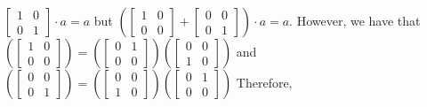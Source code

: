 \documentclass[]{article}
\begin{document}
$
\begin{bmatrix}
	1 & 0 \\
	0 & 1 
\end{bmatrix}
\cdot a = a$
but 
$
\left(\begin{bmatrix}
	1 & 0 \\
	0 & 0 
\end{bmatrix} + \begin{bmatrix}
0 & 0 \\
0 & 1 
\end{bmatrix}\right)
\cdot a = a$. However, we have that
$
\left(\begin{bmatrix}
	1 & 0 \\
	0 & 0 
\end{bmatrix}
\right)
=
\left(\begin{bmatrix}
	0 & 1 \\
	0 & 0 
\end{bmatrix}
\right)
\left(\begin{bmatrix}
	0 & 0 \\
	1 & 0 
\end{bmatrix}
\right)
$
and
$
\left(\begin{bmatrix}
	0 & 0 \\
	0 & 1 
\end{bmatrix}
\right)
=
\left(\begin{bmatrix}
	0 & 0 \\
	1 & 0 
\end{bmatrix}
\right)
\left(\begin{bmatrix}
	0 & 1 \\
	0 & 0 
\end{bmatrix}
\right)
$
Therefore,
\end{document}
